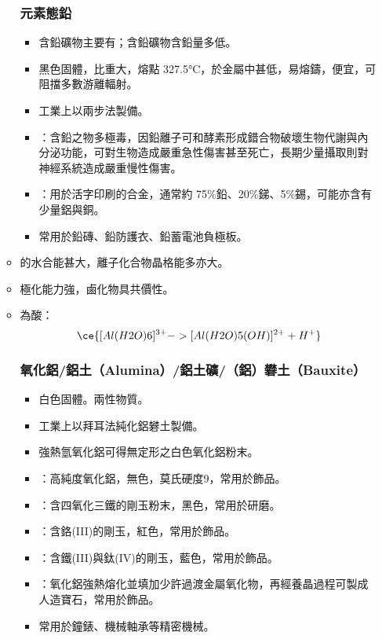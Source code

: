 \documentclass[a4paper,12pt]{report}
\begin{document}
\begin{itemize}
\begin{itemize}
\subsubsection{元素態鉛}
\begin{itemize}
\item 含鉛礦物主要有；含鉛礦物含鉛量多低。
\item 黑色固體，比重大，熔點 327.5°C，於金屬中甚低，易熔鑄，便宜，可阻擋多數游離輻射。
\item 工業上以兩步法製備。
\item {}：含鉛之物多極毒，因鉛離子可和酵素形成錯合物破壞生物代謝與內分泌功能，可對生物造成嚴重急性傷害甚至死亡，長期少量攝取則對神經系統造成嚴重慢性傷害。
\item {}：用於活字印刷的合金，通常約 75\%鉛、20\%銻、5\%錫，可能亦含有少量鋁與銅。
\item 常用於鉛磚、鉛防護衣、鉛蓄電池負極板。
\end{itemize}
\bit
\item {}的水合能甚大，離子化合物晶格能多亦大。
\item {}極化能力強，鹵化物具共價性。
\item {}為酸：
\[\ce{[Al(H2O)6]^{3+} -> [Al(H2O)5(OH)]^{2+} + H^+}\]
\eit
\subsubsection{氧化鋁/鋁土（Alumina）/鋁土礦/（鋁）礬土（Bauxite）}
\begin{itemize}
\item 白色固體。兩性物質。
\item 工業上以拜耳法純化鋁礬土製備。
\item 強熱氫氧化鋁可得無定形之白色氧化鋁粉末。
\item {}：高純度氧化鋁，無色，莫氏硬度9，常用於飾品。
\item {}：含四氧化三鐵的剛玉粉末，黑色，常用於研磨。
\item {}：含鉻(III)的剛玉，紅色，常用於飾品。
\item {}：含鐵(III)與鈦(IV)的剛玉，藍色，常用於飾品。
\item {}：氧化鋁強熱熔化並填加少許過渡金屬氧化物，再經養晶過程可製成人造寶石，常用於飾品。
\item 常用於鐘錶、機械軸承等精密機械。
\end{itemize}

\end{itemize}
\end{itemize}
\end{document}
